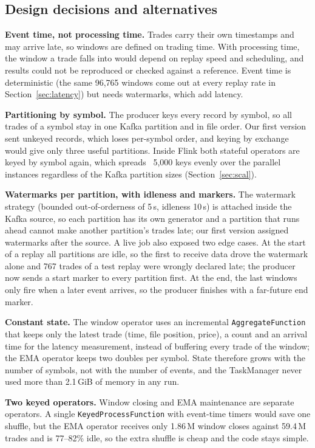 \documentclass[sigconf]{acmart}
\begin{document}
\subsection{Design decisions and alternatives}
\textbf{Event time, not processing time.} Trades carry their own timestamps and may arrive late, so windows are defined on trading time. With processing time, the window a trade falls into would depend on replay speed and scheduling, and results could not be reproduced or checked against a reference. Event time is deterministic (the same 96,765 windows come out at every replay rate in Section~\ref{sec:latency}) but needs watermarks, which add latency.

\textbf{Partitioning by symbol.} The producer keys every record by symbol, so all trades of a symbol stay in one Kafka partition and in file order. Our first version sent unkeyed records, which loses per-symbol order, and keying by exchange would give only three useful partitions. Inside Flink both stateful operators are keyed by symbol again, which spreads ~5,000 keys evenly over the parallel instances regardless of the Kafka partition sizes (Section~\ref{sec:scal}).

\textbf{Watermarks per partition, with idleness and markers.} The watermark strategy (bounded out-of-orderness of 5\,s, idleness 10\,s) is attached inside the Kafka source, so each partition has its own generator and a partition that runs ahead cannot make another partition's trades late; our first version assigned watermarks after the source. A live job also exposed two edge cases. At the start of a replay all partitions are idle, so the first to receive data drove the watermark alone and 767 trades of a test replay were wrongly declared late; the producer now sends a start marker to every partition first. At the end, the last windows only fire when a later event arrives, so the producer finishes with a far-future end marker.

\textbf{Constant state.} The window operator uses an incremental \texttt{AggregateFunction} that keeps only the latest trade (time, file position, price), a count and an arrival time for the latency measurement, instead of buffering every trade of the window; the EMA operator keeps two doubles per symbol. State therefore grows with the number of symbols, not with the number of events, and the TaskManager never used more than 2.1\,GiB of memory in any run.

\textbf{Two keyed operators.} Window closing and EMA maintenance are separate operators. A single \texttt{KeyedProcessFunction} with event-time timers would save one shuffle, but the EMA operator receives only 1.86\,M window closes against 59.4\,M trades and is 77--82\% idle, so the extra shuffle is cheap and the code stays simple.
\end{document}
